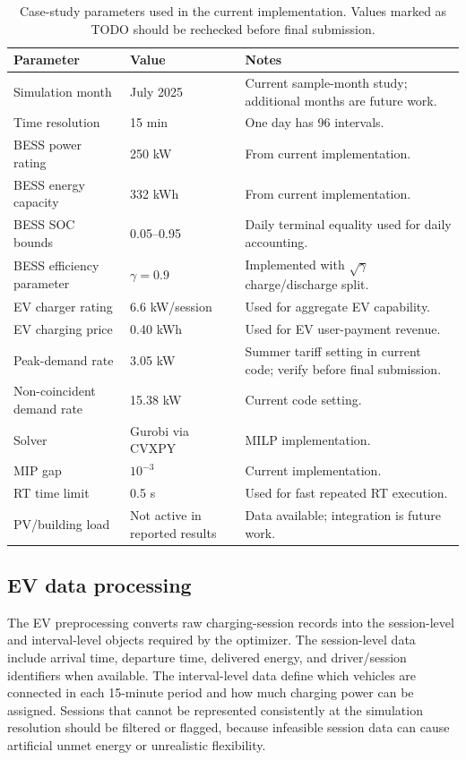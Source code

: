 \documentclass[final,5p,times]{elsarticle}
\begin{document}
\begin{table}[!t]
\centering
\caption{Case-study parameters used in the current implementation. Values marked as TODO should be rechecked before final submission.}
\label{tab:case_parameters}
\scriptsize
\begin{tabularx}{\textwidth}{@{}p{}p{}X@{}}
\toprule
Parameter & Value & Notes \\
\midrule
Simulation month & July 2025 & Current sample-month study; additional months are future work.\\
Time resolution & 15 min & One day has 96 intervals.\\
BESS power rating & 250 kW & From current implementation.\\
BESS energy capacity & 332 kWh & From current implementation.\\
BESS SOC bounds & 0.05--0.95 & Daily terminal equality used for daily accounting.\\
BESS efficiency parameter & $\gamma=0.9$ & Implemented with $\sqrt{\gamma}$ charge/discharge split.\\
EV charger rating & 6.6 kW/session & Used for aggregate EV capability.\\
EV charging price & 0.40 \/kWh & Used for EV user-payment revenue.\\
Peak-demand rate & 3.05 \/kW & Summer tariff setting in current code; verify before final submission.\\
Non-coincident demand rate & 15.38 \/kW & Current code setting.\\
Solver & Gurobi via CVXPY & MILP implementation.\\
MIP gap & $10^{-3}$ & Current implementation.\\
RT time limit & 0.5 s & Used for fast repeated RT execution.\\
PV/building load & Not active in reported results & Data available; integration is future work.\\
\bottomrule
\end{tabularx}
\end{table}

\subsection{EV data processing}
The EV preprocessing converts raw charging-session records into the session-level and interval-level objects required by the optimizer. The session-level data include arrival time, departure time, delivered energy, and driver/session identifiers when available. The interval-level data define which vehicles are connected in each 15-minute period and how much charging power can be assigned. Sessions that cannot be represented consistently at the simulation resolution should be filtered or flagged, because infeasible session data can cause artificial unmet energy or unrealistic flexibility.
\end{document}
